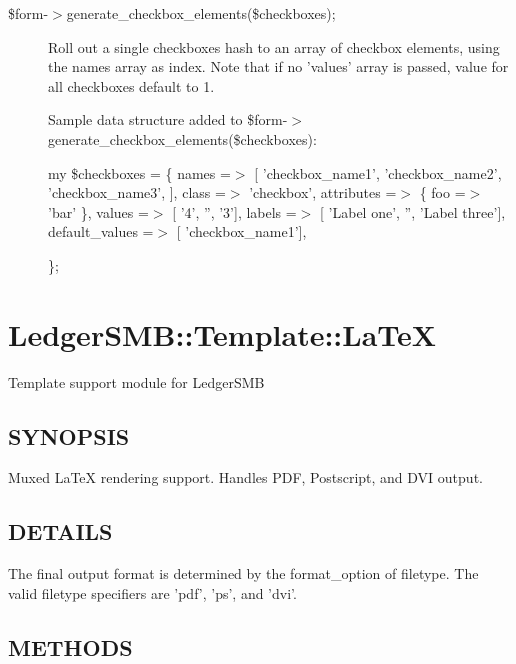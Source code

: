 \begin{description}
\begin{description}
\begin{description}
\begin{description}
\begin{description}
\begin{description}
\begin{description}
\begin{description}
\begin{description}
\begin{description}
\begin{description}
\item[{\$form-$>$generate\_checkbox\_elements(\$checkboxes);}] \mbox{}

Roll out a single checkboxes hash to an array of checkbox elements,
using the names array as index.  Note that if no 'values' array
is passed, value for all checkboxes default to 1.



Sample data structure added to \$form-$>$generate\_checkbox\_elements(\$checkboxes):



my \$checkboxes = \{
    names =$>$ [
        'checkbox\_name1',
        'checkbox\_name2',
        'checkbox\_name3',
    ],
    class =$>$ 'checkbox',
    attributes =$>$ \{ foo =$>$ 'bar' \},
    values =$>$ [ '4', '', '3'],
    labels =$>$ [ 'Label one', '', 'Label three'],
    default\_values =$>$ [ 'checkbox\_name1'],



\};

\end{description}
\section{LedgerSMB::Template::LaTeX\label{LedgerSMB::Template::LaTeX}}


Template support module for LedgerSMB

\subsection*{SYNOPSIS\label{LedgerSMB::Template::LaTeX_SYNOPSIS}}


Muxed LaTeX rendering support.  Handles PDF, Postscript, and DVI output.

\subsection*{DETAILS\label{LedgerSMB::Template::LaTeX_DETAILS}}


The final output format is determined by the format\_option of filetype.  The
valid filetype specifiers are 'pdf', 'ps', and 'dvi'.

\subsection*{METHODS\label{LedgerSMB::Template::LaTeX_METHODS}}
\begin{description}


\end{description}
\end{description}
\end{description}
\end{description}
\end{description}
\end{description}
\end{description}
\end{description}
\end{description}
\end{description}
\end{description}
